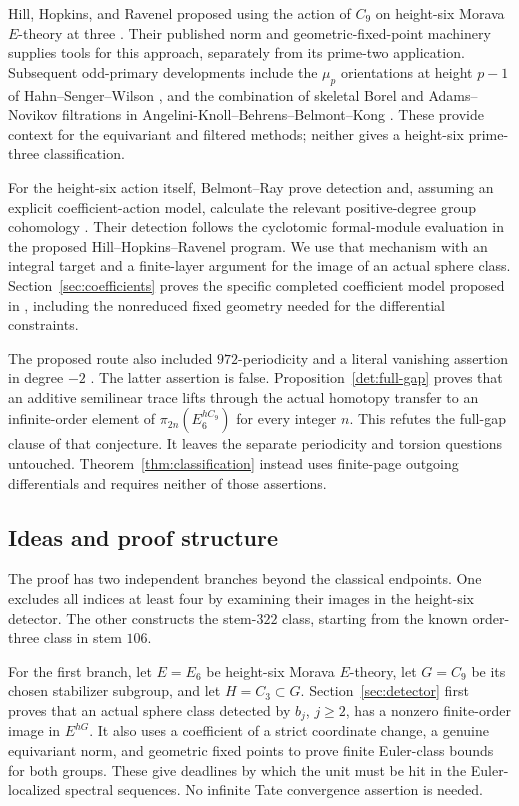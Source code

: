 Hill, Hopkins, and Ravenel proposed using the action of $C_9$ on height-six Morava $E$-theory at three \cite{HHR2011}. Their published norm and geometric-fixed-point machinery \cite{HHR2016} supplies tools for this approach, separately from its prime-two application. Subsequent odd-primary developments include the $\mu_p$ orientations at height $p-1$ of Hahn--Senger--Wilson \cite{HahnSengerWilson}, and the combination of skeletal Borel and Adams--Novikov filtrations in Angelini-Knoll--Behrens--Belmont--Kong \cite{AKBBK}. These provide context for the equivariant and filtered methods; neither gives a height-six prime-three classification.

For the height-six action itself, Belmont--Ray prove detection \cite[Proposition~0.2]{BR} and, assuming an explicit coefficient-action model, calculate the relevant positive-degree group cohomology \cite[Theorem~0.6]{BR}. Their detection follows the cyclotomic formal-module evaluation in the proposed Hill--Hopkins--Ravenel program. We use that mechanism with an integral target and a finite-layer argument for the image of an actual sphere class. Section~\ref{sec:coefficients} proves the specific completed coefficient model proposed in \cite[Conjecture~0.3]{BR}, including the nonreduced fixed geometry needed for the differential constraints.

The proposed route also included $972$-periodicity and a literal vanishing assertion in degree $-2$ \cite[Conjecture~0.1]{BR}. The latter assertion is false. Proposition~\ref{det:full-gap} proves that an additive semilinear trace lifts through the actual homotopy transfer to an infinite-order element of $\pi_{2n}(E_6^{hC_9})$ for every integer $n$. This refutes the full-gap clause of that conjecture. It leaves the separate periodicity and torsion questions untouched. Theorem~\ref{thm:classification} instead uses finite-page outgoing differentials and requires neither of those assertions.

\subsection{Ideas and proof structure}

The proof has two independent branches beyond the classical endpoints. One excludes all indices at least four by examining their images in the height-six detector. The other constructs the stem-$322$ class, starting from the known order-three class in stem $106$.

For the first branch, let $E=E_6$ be height-six Morava $E$-theory, let $G=C_9$ be its chosen stabilizer subgroup, and let $H=C_3\subset G$. Section~\ref{sec:detector} first proves that an actual sphere class detected by $b_j$, $j\geq2$, has a nonzero finite-order image in $E^{hG}$. It also uses a coefficient of a strict coordinate change, a genuine equivariant norm, and geometric fixed points to prove finite Euler-class bounds for both groups. These give deadlines by which the unit must be hit in the Euler-localized spectral sequences. No infinite Tate convergence assertion is needed.

